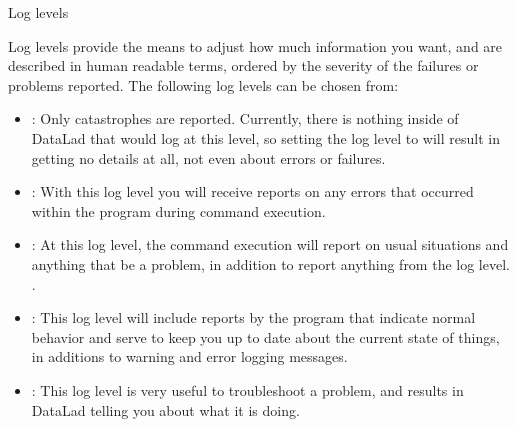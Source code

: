 \ignorespaces \begin{findoutmore}[label={fom-loglevels}, before title={\thetcbcounter\ }, float, floatplacement=tbp, check odd page=true]{Log levels}
\label{\detokenize{basics/101-135-help:fom-loglevels}}

\sphinxAtStartPar
Log levels provide the means to adjust how much information you want, and are described in human readable terms, ordered by the severity of the failures or problems reported.
The following log levels can be chosen from:
\begin{itemize}
\item {} 
\sphinxAtStartPar
{}: Only catastrophes are reported. Currently, there is nothing inside of DataLad that would log at this level, so setting the log level to  will result in getting no details at all, not even about errors or failures.

\item {} 
\sphinxAtStartPar
{}: With this log level you will receive reports on any errors that occurred within the program during command execution.

\item {} 
\sphinxAtStartPar
{}: At this log level, the command execution will report on usual situations and anything that  be a problem, in addition to report anything from the  log level. .

\item {} 
\sphinxAtStartPar
{}: This log level will include reports by the program that indicate normal behavior and serve to keep you up to date about the current state of things, in additions to warning and error logging messages.

\item {} 
\sphinxAtStartPar
{}: This log level is very useful to troubleshoot a problem, and results in DataLad telling you  about what it is doing.


\end{itemize}
\end{findoutmore}
